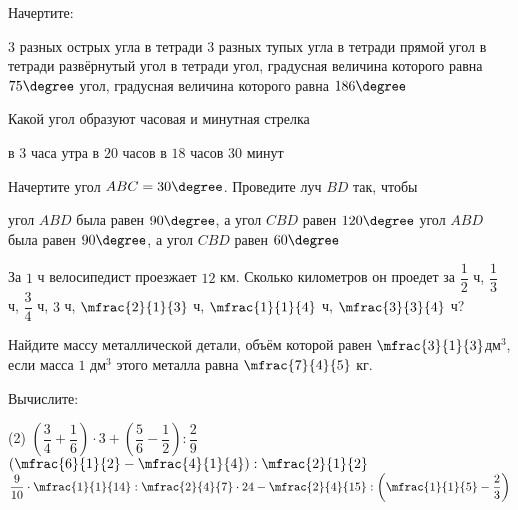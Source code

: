 %
%
\begin{class}[number=6]
	\begin{listofex}
		\item Начертите:
		\begin{tasks}
			\task \( 3 \) разных острых угла в тетради
			\task \( 3 \) разных тупых угла в тетради
			\task прямой угол в тетради
			\task развёрнутый угол в тетради
			\task угол, градусная величина которого равна \( 75\degree \)
			\task угол, градусная величина которого равна \( 186\degree \)
			\end{tasks}
		\item Какой угол образуют часовая и минутная стрелка
		\begin{tasks}
			\task в \( 3 \) часа утра
			\task в \( 20 \) часов
			\task в \( 18 \) часов \( 30 \) минут
		\end{tasks}
		\item Начертите угол \( ABC=30\degree \). Проведите луч \( BD \) так, чтобы 
		\begin{tasks}
			\task угол \( ABD \) была равен \( 90\degree \), а угол \( CBD \) равен \( 120\degree \)
			\task угол \( ABD \) была равен \( 90\degree \), а угол \( CBD \) равен \( 60\degree \)
		\end{tasks}
		\item За \( 1 \) ч велосипедист проезжает \( 12 \) км. Сколько километров он проедет за \( \dfrac{1}{2} \) ч, \( \dfrac{1}{3} \) ч, \( \dfrac{3}{4} \) ч, \( 3 \) ч, \( \mfrac{2}{1}{3} \) ч, \( \mfrac{1}{1}{4} \) ч, \( \mfrac{3}{3}{4} \) ч?
		\item Найдите массу металлической детали, объём которой равен \( \mfrac{3}{1}{3} \)дм\( ^3 \), если масса \( 1 \) дм\( ^3\) этого металла равна \( \mfrac{7}{4}{5} \) кг.
		\item Вычислите:
		\begin{tasks}(2)
			\task \( \left( \dfrac{3}{4}+\dfrac{1}{6} \right)\cdot3+\left( \dfrac{5}{6}-\dfrac{1}{2} \right):\dfrac{2}{9} \)
			\task \( \left( \mfrac{6}{1}{2}-\mfrac{4}{1}{4} \right):\mfrac{2}{1}{2} \)
			\task \( \dfrac{9}{10}\cdot\mfrac{1}{1}{14}:\mfrac{2}{4}{7}\cdot24-\mfrac{2}{4}{15}:\left( \mfrac{1}{1}{5}-\dfrac{2}{3} \right) \)
		\end{tasks}
	\end{listofex}
\end{class}
%
%
%

